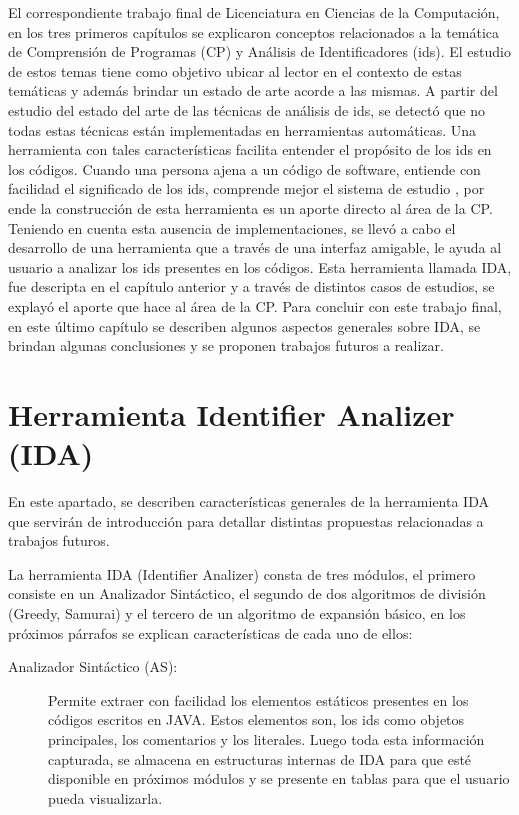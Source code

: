 \fancyhf{}
\pagestyle{fancy}
\lhead[]{\leftmark}
\chead[]{}
\rhead[]{\thepage}
\renewcommand{\headrulewidth}{1pt}

El correspondiente trabajo final de Licenciatura en Ciencias de la Computación, en los tres primeros capítulos se explicaron conceptos relacionados a la temática de Comprensión de Programas (CP) y Análisis de Identificadores (ids). El estudio de estos temas tiene como objetivo ubicar al lector en el contexto de estas temáticas y además brindar un estado de arte acorde a las mismas. 
A partir del estudio del estado del arte de las técnicas de análisis de ids, se detectó que no todas estas técnicas están implementadas en herramientas automáticas. Una herramienta con tales características facilita entender el propósito de los ids en los códigos. Cuando una persona ajena a un código de software, entiende con facilidad el significado de los ids, comprende mejor el sistema de estudio \cite{EZH08,DFPM05,BCPT00,DMDJ13}, por ende la construcción de esta herramienta es un aporte directo al área de la CP. Teniendo en cuenta esta ausencia de implementaciones, se llevó a cabo el desarrollo de una herramienta que a través de una interfaz amigable, le ayuda al usuario a analizar los ids presentes en los códigos. Esta herramienta llamada IDA, fue descripta en el capítulo anterior y a través de distintos casos de estudios, se explayó el aporte que hace al área de la CP. Para concluir con este trabajo final, en este último capítulo se describen algunos aspectos generales sobre IDA, se brindan algunas conclusiones y se proponen trabajos futuros a realizar.

\section{Herramienta Identifier Analizer (IDA)} 

En este apartado, se describen características generales de la herramienta IDA que servirán de introducción para detallar distintas propuestas relacionadas a trabajos futuros.

La herramienta IDA (Identifier Analizer) consta de tres módulos, el primero consiste en un Analizador Sintáctico, el segundo de dos algoritmos de división (Greedy, Samurai) y el tercero de un algoritmo de expansión básico, en los próximos párrafos se explican características de cada uno de ellos:

\begin{description}

\item[Analizador Sintáctico (AS):] Permite extraer con facilidad los elementos estáticos presentes en los códigos escritos en JAVA. Estos elementos son, los ids como objetos principales, los comentarios y los literales. Luego toda esta información capturada, se almacena en estructuras internas de IDA para que esté disponible en próximos módulos y se presente en tablas para que el usuario pueda visualizarla.

\end{description}

